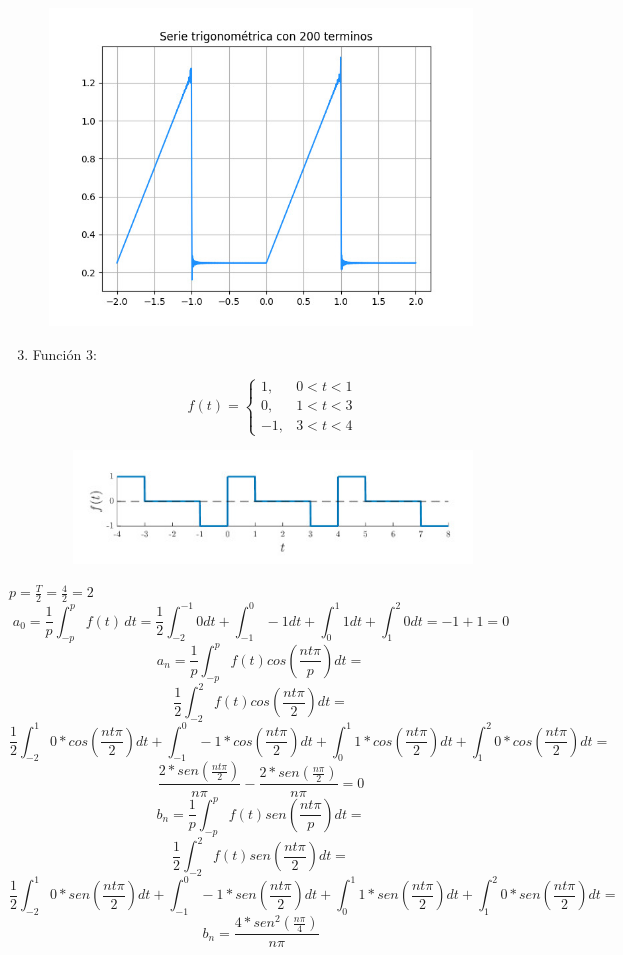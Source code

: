 \documentclass[
	12pt, %
]{fphw}
\begin{document}
\begin{figure}[H]
  \centering
  \includegraphics[scale=0.8]{images/funcion1.jpg}
\end{figure}

\newpage
\begin{enumerate}
  \setcounter{enumi}{2}
\item Función 3:

  \[f(t) =\left\{ \begin{array}{lr}1, & 0 < t < 1 \\0, & 1 < t < 3\\-1, & 3 < t < 4 \end{array}\right.\]
  
  \begin{figure}[H]
    \centering
    \includegraphics[scale=0.5]{images/funcion_two.jpg}
  \end{figure}
  
\end{enumerate}

$p=\frac{T}{2}=\frac{4}{2}=2$\\
\dotfill
\[a_{0} = \frac{1}{p}\int_{-p}^{p} f(t) \,dt = \frac{1}{2}\int_{-2}^{-1}0 dt + \int_{-1}^{0}-1 dt + \int_{0}^{1}1 dt + \int_{1}^{2}0 dt =  -1+1 = 0 \]
\dotfill
\[a_{n}=\frac{1}{p}\int_{-p}^{p} f(t) cos(\frac{nt\pi}{p}) dt =\]
\[\frac{1}{2}\int_{-2}^{2} f(t) cos(\frac{nt\pi}{2}) dt =\]
\[\frac{1}{2}\int_{-2}^{1} 0*cos(\frac{nt\pi}{2}) dt + \int_{-1}^{0} -1*cos(\frac{nt\pi}{2}) dt + \int_{0}^{1} 1*cos(\frac{nt\pi}{2}) dt + \int_{1}^{2} 0*cos(\frac{nt\pi}{2}) dt =\]
\[ \frac{2*sen(\frac{nt\pi}{2})}{n\pi} - \frac{2*sen(\frac{n\pi}{2})}{n\pi} = 0\]
\dotfill
\[b_{n}=\frac{1}{p}\int_{-p}^{p} f(t) sen(\frac{nt\pi}{p}) dt =\]
\[\frac{1}{2}\int_{-2}^{2} f(t) sen(\frac{nt\pi}{2}) dt =\]
\[\frac{1}{2}\int_{-2}^{1} 0*sen(\frac{nt\pi}{2}) dt + \int_{-1}^{0} -1*sen(\frac{nt\pi}{2}) dt + \int_{0}^{1} 1*sen(\frac{nt\pi}{2}) dt + \int_{1}^{2} 0*sen(\frac{nt\pi}{2}) dt =\]
\[b_{n}=\frac{4*sen^{2}(\frac{n\pi}{4})}{n\pi}\]
\end{document}
